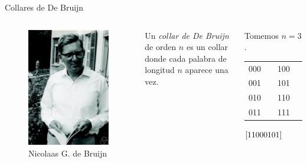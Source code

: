 \documentclass[spanish,xcolor={table}]{beamer}
\begin{document}
\begin{frame}{Collares de De Bruijn}

\begin{columns}
  \begin{figure}
    \includegraphics[width=\textwidth]{de-bruijn.jpg}
    \caption{Nicolaas G. de Bruijn}
  \end{figure}

  Un \emph{collar de De Bruijn} de orden $n$ es un collar donde cada palabra de longitud $n$ aparece una vez.
  
  \begin{example}
    Tomemos $n = 3$. \vspace{-.5em}

    \begin{multicols}{2}
      \begin{tabular}{lclc}
        000 & & 100 & \\
        001 & & 101 & \\
        010 & & 110 & \\ 
        011 & & 111 & \\
      \end{tabular}
      \columnbreak
      $\left[11000101\right]$
    \end{multicols}
  \end{example}
\end{columns}

\end{frame}
\end{document}

